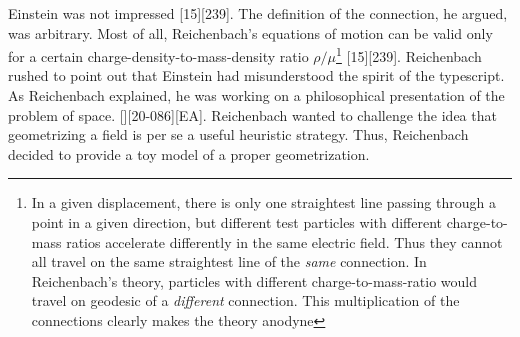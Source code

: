 \documentclass[draft]{article}
\newcommand{\ap}{\ensuremath{\tau}\xspace}
\newcommand{\xdx}{\ensuremath{x_\nu} and \ensuremath{x_\nu + dx_\nu}\xspace}
\begin{document}


Einstein was not impressed [15][239]. The definition of the connection, he argued, was arbitrary. Most of all, Reichenbach's equations of motion can be valid only for a certain charge-density-to-mass-density ratio $\rho/\mu$\footnote{In a given displacement, there is only one straightest line passing through a point in a given direction, but different test particles with different charge-to-mass ratios accelerate differently in the same electric field. Thus they cannot all travel on the same straightest line of the \emph{same} connection. In Reichenbach's theory, particles with different charge-to-mass-ratio would travel on geodesic of a \emph{different} connection. This multiplication of the connections clearly makes the theory anodyne} [15][239]. Reichenbach rushed to point out that Einstein had misunderstood the spirit of the typescript. As Reichenbach explained, he was working on a philosophical presentation of the problem of space. [][20-086][EA]. Reichenbach wanted to challenge the idea that geometrizing a field is per se a useful heuristic strategy. Thus, Reichenbach decided to provide a toy model of a proper geometrization. 
\end{document}
